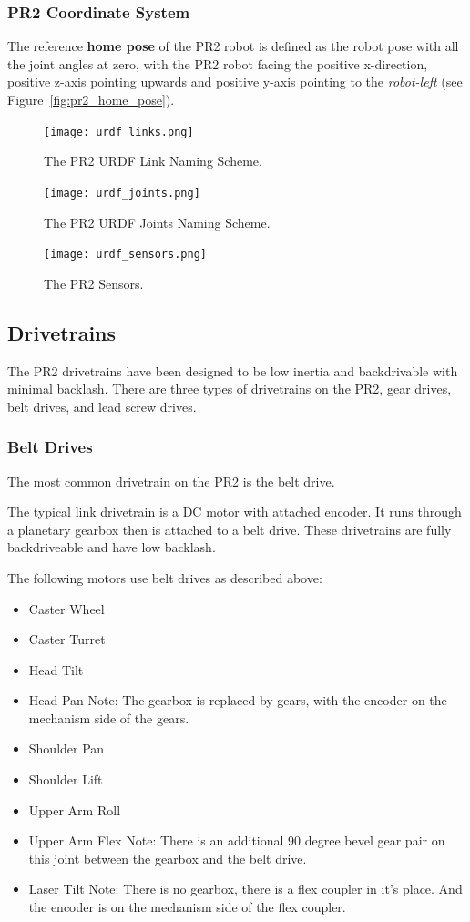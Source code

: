 \subsubsection{PR2 Coordinate System}
\label{sec:pr2_coordinate_system}
The reference {\bf home pose} of the PR2 robot is defined as the robot pose with all the joint angles at zero,
with the PR2 robot facing the positive x-direction, positive z-axis pointing upwards and positive y-axis pointing to the {\it robot-left} (see Figure~\ref{fig:pr2_home_pose}).

\begin{figure}[!h]
\centering
\texttt{[image: urdf\_links.png]}
\caption{The PR2 URDF Link Naming Scheme.}
\label{fig:urdf_link_names}
\texttt{[image: urdf\_joints.png]}
\caption{The PR2 URDF Joints Naming Scheme.}
\label{fig:urdf_joints}
\texttt{[image: urdf\_sensors.png]}
\caption{The PR2 Sensors.}
\label{fig:urdf_sensor}
\end{figure}

\subsection{Drivetrains}
The PR2 drivetrains have been designed to be low inertia and
backdrivable with minimal backlash. There are three types of
drivetrains on the PR2, gear drives, belt drives, and lead screw
drives.  

\subsubsection{Belt Drives}
The most common drivetrain on the PR2 is the belt drive.  

The typical link drivetrain is a DC motor with attached encoder.  It
runs through a planetary gearbox then is attached to a belt
drive. These drivetrains are fully backdriveable and have low
backlash.

The following motors use belt drives as described above:
\begin{itemize}
\item Caster Wheel
\item Caster Turret
\item Head Tilt
\item Head Pan
\subitem Note: The gearbox is replaced by gears, with the encoder on the mechanism side of the gears.  
\item Shoulder Pan
\item Shoulder Lift
\item Upper Arm Roll
\item Upper Arm Flex
\subitem Note: There is an additional 90 degree bevel gear pair on this joint between the gearbox and the belt drive. 
\item Laser Tilt
\subitem Note: There is no gearbox, there is a flex coupler in it's place.  And the encoder is on the mechanism side of the flex coupler.
\end{itemize}


